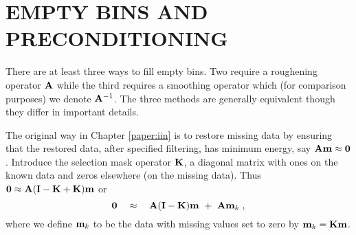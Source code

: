 %
%



\section{EMPTY BINS AND PRECONDITIONING}
There are at least three ways to fill empty bins.
Two require a roughening operator $\bold A$ while
the third requires a smoothing operator which
(for comparison purposes) we denote $\bold A^{-1}$.
The three methods are generally equivalent
though they differ in important details.

\par
The original way in
Chapter \ref{paper:iin} is to
restore missing data
by ensuring that the restored data,
after specified filtering,
has minimum energy, say
$\bold A\bold m\approx \bold 0$.
Introduce the selection mask operator $\bold K$, 
a diagonal matrix with
ones on the known data and zeros elsewhere
(on the missing data).
Thus
$ \bold 0 \approx \bold A(\bold I-\bold K+\bold K)\bold m $ or
\begin{equation}
\bold 0 \quad\approx\quad
\bold A (\bold I-\bold K) \bold m
\ +\ 
\bold A \bold m_k\;,
\label{eqn:style0}
\end{equation}
where we define $\bold m_k$ to be the data
with missing values set to zero by 
$\bold m_k=\bold K\bold m$.

